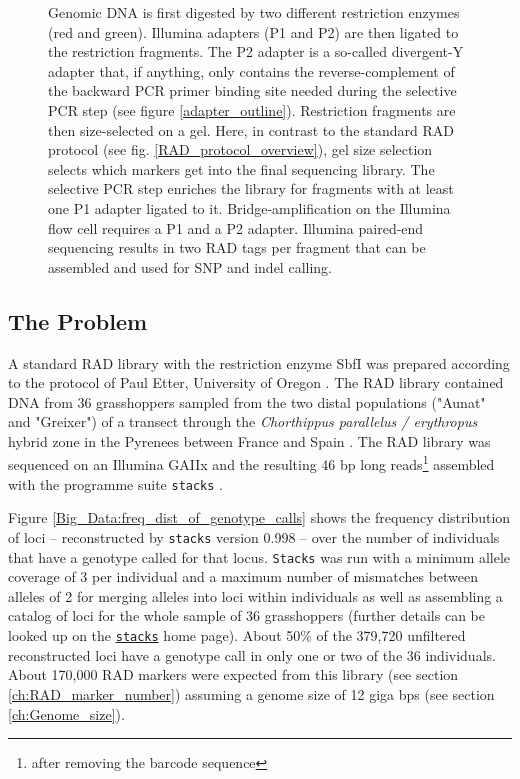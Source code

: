 \documentclass[a4paper,12pt,times,authoryear,twoside,print,index]{Classes/PhDThesisPSnPDF}\usepackage[]{graphicx}\usepackage[]{color}
\begin{document}
\begin{figure}[t]
\ContinuedFloat
\caption[]{Genomic DNA is first digested by two different restriction enzymes (red and green). Illumina adapters (P1 and P2) are then ligated to the restriction fragments. The P2 adapter is a so-called divergent-Y adapter that, if anything, only contains the reverse-complement of the backward PCR primer binding site needed during the selective PCR step (see figure \ref{adapter_outline}). Restriction fragments are then size-selected on a gel. Here, in contrast to the standard RAD protocol (see fig. \ref{RAD_protocol_overview}), gel size selection selects which markers get into the final sequencing library. The selective PCR step enriches the library for fragments with at least one P1 adapter ligated to it. Bridge-amplification on the Illumina flow cell requires a P1 and a P2 adapter. Illumina paired-end sequencing results in two RAD tags per fragment that can be assembled and used for SNP and indel calling.}
\end{figure}


\subsection{The Problem}

A standard RAD library with the restriction enzyme \gls{SbfI} was prepared according to the protocol of Paul Etter, University of Oregon \citep{Baird2008}. The RAD library contained DNA from 36 grasshoppers sampled from the two distal populations ("Aunat" and "Greixer") of a transect through the \textit{Chorthippus parallelus / erythropus} hybrid zone in the Pyrenees between France and Spain \citep{Hewitt1987}. The RAD library was sequenced on an Illumina GAIIx and the resulting 46 \gls{bp}  long reads\footnote{after removing the barcode sequence} assembled with the programme suite \texttt{stacks} \citep{Catchen2011}.

Figure \ref{Big_Data:freq_dist_of_genotype_calls} shows the frequency distribution of loci -- reconstructed by \texttt{stacks} version 0.998  -- over the number of individuals that have a genotype called for that locus. \texttt{Stacks} was run with a minimum allele coverage of 3 per individual and a maximum number of mismatches between alleles of 2 for merging alleles into loci within individuals as well as assembling a catalog of loci for the whole sample of 36 grasshoppers (further details can be looked up on the \href{http://creskolab.uoregon.edu/stacks/param_tut.php}{\texttt{stacks}} home page). About 50\% of the 379,720 unfiltered reconstructed loci have a genotype call in only one or two of the 36 individuals. About 170,000 RAD markers were expected from this library (see section \ref{ch:RAD_marker_number}) assuming a genome size of 12 giga \glspl{bp} (see section \ref{ch:Genome_size}).
\end{document}
